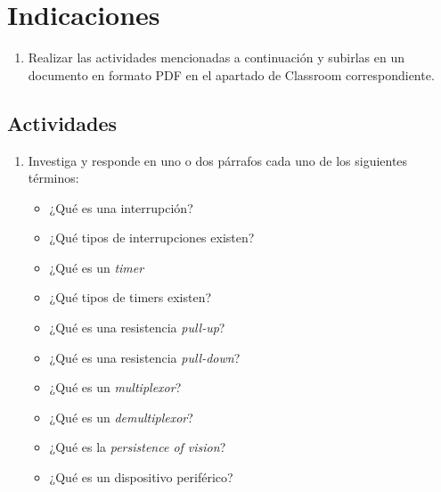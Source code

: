 \documentclass[11pt,letterpaper]{article}
\begin{document}

\section*{Indicaciones}
\begin{enumerate}[label=(\roman*)]
    \item Realizar las actividades mencionadas a continuación y subirlas en un documento en formato PDF en el apartado de Classroom correspondiente. 
\end{enumerate}
\subsection*{Actividades}
\begin{enumerate}[label=\arabic*)]
    \item Investiga y responde en uno o dos párrafos cada uno de los siguientes términos:
    \begin{itemize}
        \item ¿Qué es una interrupción?
        \item ¿Qué tipos de interrupciones existen?
        \item ¿Qué es un \textit{timer}
        \item ¿Qué tipos de timers existen?
        \item ¿Qué es una resistencia \textit{pull-up}?
        \item ¿Qué es una resistencia \textit{pull-down}?
        \item ¿Qué es un \textit{multiplexor}?
        \item ¿Qué es un \textit{demultiplexor}?
        \item ¿Qué es la \textit{persistence of vision}?
        \item ¿Qué es un dispositivo periférico?
    \end{itemize}
    
\end{enumerate}
\end{document}
